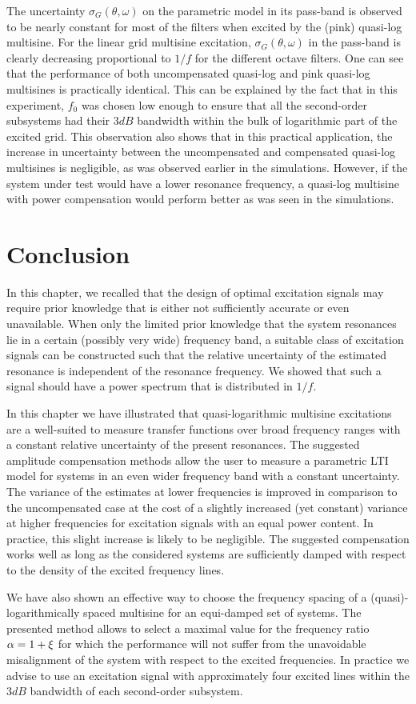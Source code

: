     The uncertainty $\sigma_G\left(\theta,\omega\right)$ on the parametric model in its pass-band is observed to be nearly constant for most of the filters when excited by the (pink) quasi-log multisine.
    For the linear grid multisine excitation, $\sigma_G\left(\theta,\omega\right)$ in the pass-band is clearly decreasing proportional to $1 / f$ for the different octave filters.
    One can see that the performance of both uncompensated quasi-log and pink quasi-log multisines is practically identical.
    This can be explained by the fact that in this experiment, $f_0$ was chosen low enough to ensure that all the second-order subsystems had their $3\unit{dB}$ bandwidth within the bulk of logarithmic part of the excited grid.
    This observation also shows that in this practical application, the increase in uncertainty between the uncompensated and compensated quasi-log multisines is negligible, as was observed earlier in the simulations.
    However, if the system under test would have a lower resonance frequency, a quasi-log multisine with power compensation would perform better as was seen in the simulations.

\section{Conclusion}
\label{sec:excitation:conclusion}
In this chapter, we recalled that the design of optimal excitation signals may require prior knowledge that is either not sufficiently accurate or even unavailable.
When only the limited prior knowledge that the system resonances lie in a certain (possibly very wide) frequency band, a suitable class of excitation signals can be constructed such that the relative uncertainty of the estimated resonance is independent of the resonance frequency.
We showed that such a signal should have a power spectrum that is distributed in $1/f$.

In this chapter we have illustrated that quasi-logarithmic multisine excitations are a well-suited to measure transfer functions over broad frequency ranges with a constant relative uncertainty of the present resonances.
The suggested amplitude compensation methods allow the user to measure a parametric \gls{LTI} model for systems in an even wider frequency band with a constant uncertainty.
The variance of the estimates at lower frequencies is improved in comparison to the uncompensated case at the cost of a slightly increased (yet constant) variance at higher frequencies for excitation signals with an equal power content.
In practice, this slight increase is likely to be negligible.
The suggested compensation works well as long as the considered systems are sufficiently damped with respect to the density of the excited frequency lines.

We have also shown an effective way to choose the frequency spacing of a (quasi)-logarithmically spaced multisine for an equi-damped set of systems.
The presented method allows to select a maximal value for the frequency ratio $\alpha = 1 + \xi_{}$ for which the performance will not suffer from the unavoidable misalignment of the system with respect to the excited frequencies.
In practice we advise to use an excitation signal with approximately four excited lines within the $3\unit{dB}$ bandwidth of each second-order subsystem.
